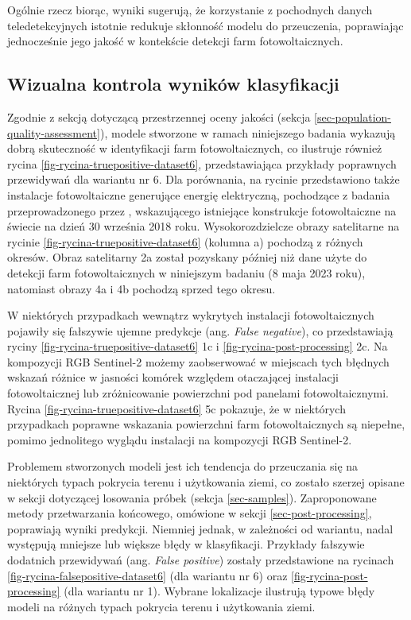\documentclass{amuthesis}
\begin{document}
Ogólnie rzecz biorąc, wyniki sugerują, że korzystanie z pochodnych
danych teledetekcyjnych istotnie redukuje skłonność modelu do
przeuczenia, poprawiając jednocześnie jego jakość w kontekście detekcji
farm fotowoltaicznych.

\hypertarget{sec-visual-quality-assessment}{%
\subsection{Wizualna kontrola wyników
klasyfikacji}\label{sec-visual-quality-assessment}}

Zgodnie z sekcją dotyczącą przestrzennej oceny jakości (sekcja
\ref{sec-population-quality-assessment}), modele stworzone w ramach
niniejszego badania wykazują dobrą skuteczność w identyfikacji farm
fotowoltaicznych, co ilustruje również rycina
\ref{fig-rycina-truepositive-dataset6}, przedstawiająca przykłady
poprawnych przewidywań dla wariantu nr 6. Dla porównania, na rycinie
przedstawiono także instalacje fotowoltaiczne generujące energię
elektryczną, pochodzące z badania przeprowadzonego przez
\textcite{kruitwagen_2021_pv}, wskazującego istniejące konstrukcje
fotowoltaiczne na świecie na dzień 30 września 2018 roku.
Wysokorozdzielcze obrazy satelitarne na rycinie
\ref{fig-rycina-truepositive-dataset6} (kolumna a) pochodzą z różnych
okresów. Obraz satelitarny 2a został pozyskany później niż dane użyte do
detekcji farm fotowoltaicznych w niniejszym badaniu (8 maja 2023 roku),
natomiast obrazy 4a i 4b pochodzą sprzed tego okresu.

W niektórych przypadkach wewnątrz wykrytych instalacji fotowoltaicznych
pojawiły się fałszywie ujemne predykcje (ang. \emph{False negative}), co
przedstawiają ryciny \ref{fig-rycina-truepositive-dataset6} 1c i
\ref{fig-rycina-post-processing} 2c. Na kompozycji RGB Sentinel-2 możemy
zaobserwować w miejscach tych błędnych wskazań różnice w jasności
komórek względem otaczającej instalacji fotowoltaicznej lub
zróżnicowanie powierzchni pod panelami fotowoltaicznymi. Rycina
\ref{fig-rycina-truepositive-dataset6} 5c pokazuje, że w niektórych
przypadkach poprawne wskazania powierzchni farm fotowoltaicznych są
niepełne, pomimo jednolitego wyglądu instalacji na kompozycji RGB
Sentinel-2.

Problemem stworzonych modeli jest ich tendencja do przeuczania się na
niektórych typach pokrycia terenu i użytkowania ziemi, co zostało
szerzej opisane w sekcji dotyczącej losowania próbek (sekcja
\ref{sec-samples}). Zaproponowane metody przetwarzania końcowego,
omówione w sekcji \ref{sec-post-processing}, poprawiają wyniki
predykcji. Niemniej jednak, w zależności od wariantu, nadal występują
mniejsze lub większe błędy w klasyfikacji. Przykłady fałszywie dodatnich
przewidywań (ang. \emph{False positive}) zostały przedstawione na
rycinach \ref{fig-rycina-falsepositive-dataset6} (dla wariantu nr 6)
oraz \ref{fig-rycina-post-processing} (dla wariantu nr 1). Wybrane
lokalizacje ilustrują typowe błędy modeli na różnych typach pokrycia
terenu i użytkowania ziemi.
\end{document}
